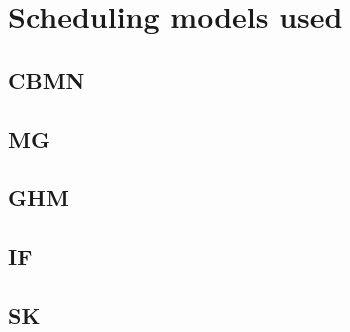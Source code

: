 \chapter{Scheduling models used}
\thispagestyle{plain}

\section{CBMN}


\section{MG}


\section{GHM}


\section{IF}


\section{SK}

